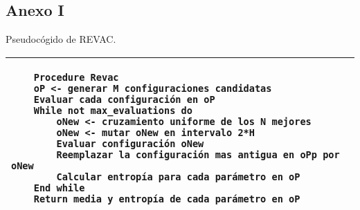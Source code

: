 \subsection{Anexo I}
Pseudocógido de REVAC.
\label{sec:anexo1}

\begin{tabular}{|p{12cm}|}
\hline

\begin{verbatim}
    Procedure Revac
    oP <- generar M configuraciones candidatas
    Evaluar cada configuración en oP
    While not max_evaluations do
        oNew <- cruzamiento uniforme de los N mejores
        oNew <- mutar oNew en intervalo 2*H
        Evaluar configuración oNew
        Reemplazar la configuración mas antigua en oPp por oNew
        Calcular entropía para cada parámetro en oP
    End while
    Return media y entropía de cada parámetro en oP
\end{verbatim}\\

\hline
\end{tabular}
